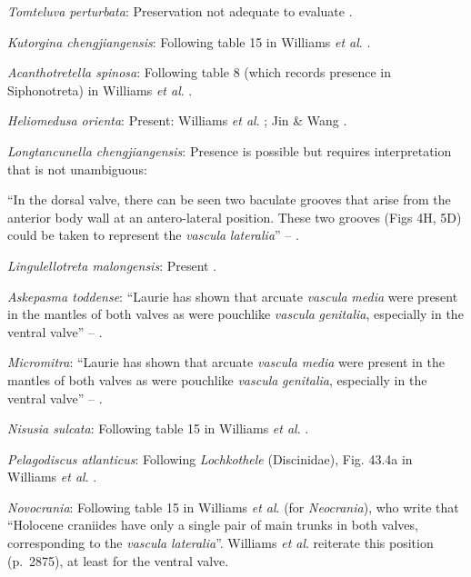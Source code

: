 \documentclass[openany]{book}
\theoremstyle{definition}
\theoremstyle{definition}
\theoremstyle{definition}
\theoremstyle{remark}
\begin{document}
\emph{Tomteluva perturbata}: Preservation not adequate to evaluate
\citep{Streng2016Anew}.

\emph{Kutorgina chengjiangensis}: Following table 15 in Williams
\emph{et al}. \citeyearpar{Williams2000BrachiopodaLinguliformea}.

\emph{Acanthotretella spinosa}: Following table 8 (which records
presence in Siphonotreta) in Williams \emph{et al}.
\citeyearpar{Williams2000BrachiopodaLinguliformea}.

\emph{Heliomedusa orienta}: Present: Williams \emph{et al}.
\citeyearpar{Williams2000BrachiopodaLinguliformea}; Jin \& Wang
\citeyearpar{Jin1992Revisionof}.

\emph{Longtancunella chengjiangensis}: Presence is possible but requires
interpretation that is not unambiguous:

``In the dorsal valve, there can be seen two baculate grooves that arise
from the\\
anterior body wall at an antero-lateral position. These two grooves
(Figs 4H, 5D) could be taken to represent the \emph{vascula}
\emph{lateralia}'' -- \citet{Zhang2007Agregarious}.

\emph{Lingulellotreta malongensis}: Present
\citep{Williams2000BrachiopodaLinguliformea}.

\emph{Askepasma toddense}: ``Laurie
\citeyearpar{Laurie1987Themusculature} has shown that arcuate
\emph{vascula} \emph{media} were present in the mantles of both valves
as were pouchlike \emph{vascula} \emph{genitalia}, especially in the
ventral valve'' -- \citet{Williams1997BrachiopodaRevised}.

\emph{Micromitra}: ``Laurie \citeyearpar{Laurie1987Themusculature} has
shown that arcuate \emph{vascula} \emph{media} were present in the
mantles of both valves as were pouchlike \emph{vascula}
\emph{genitalia}, especially in the ventral valve'' --
\citet{Williams1997BrachiopodaRevised}.

\emph{Nisusia sulcata}: Following table 15 in Williams \emph{et al}.
\citeyearpar{Williams2000BrachiopodaLinguliformea}.

\emph{Pelagodiscus atlanticus}: Following \emph{Lochkothele}
(Discinidae), Fig. 43.4a in Williams \emph{et al}.
\citeyearpar{Williams2000BrachiopodaLinguliformea}.

\emph{Novocrania}: Following table 15 in Williams \emph{et al}.
\citeyearpar{Williams2000BrachiopodaLinguliformea} (for
\emph{Neocrania}), who write that ``Holocene craniides have only a
single pair of main trunks in both valves, corresponding to the
\emph{vascula} \emph{lateralia}''. Williams \emph{et al}.
\citeyearpar{Williams2007PartH} reiterate this position (p.~2875), at
least for the ventral valve.
\end{document}
